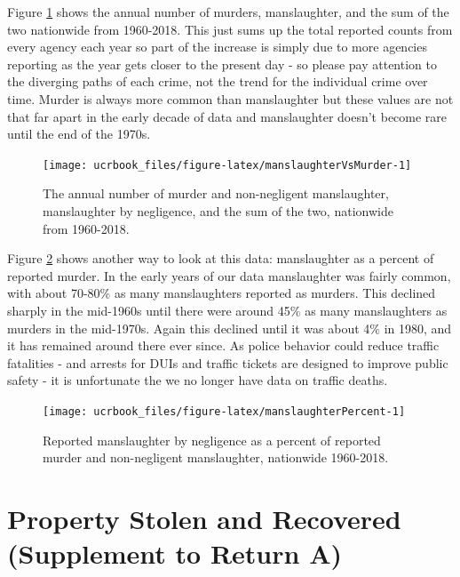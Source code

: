 \documentclass[
  12pt,
  openany]{book}
\begin{document}
Figure \ref{fig:manslaughterVsMurder} shows the annual number of murders, manslaughter, and the sum of the two nationwide from 1960-2018. This just sums up the total reported counts from every agency each year so part of the increase is simply due to more agencies reporting as the year gets closer to the present day - so please pay attention to the diverging paths of each crime, not the trend for the individual crime over time. Murder is always more common than manslaughter but these values are not that far apart in the early decade of data and manslaughter doesn't become rare until the end of the 1970s.

\begin{figure}

{\centering \texttt{[image: ucrbook\_files/figure-latex/manslaughterVsMurder-1]} 

}

\caption{The annual number of murder and non-negligent manslaughter, manslaughter by negligence, and the sum of the two, nationwide from 1960-2018.}\label{fig:manslaughterVsMurder}
\end{figure}

Figure \ref{fig:manslaughterPercent} shows another way to look at this data: manslaughter as a percent of reported murder. In the early years of our data manslaughter was fairly common, with about 70-80\% as many manslaughters reported as murders. This declined sharply in the mid-1960s until there were around 45\% as many manslaughters as murders in the mid-1970s. Again this declined until it was about 4\% in 1980, and it has remained around there ever since. As police behavior could reduce traffic fatalities - and arrests for DUIs and traffic tickets are designed to improve public safety - it is unfortunate the we no longer have data on traffic deaths.

\begin{figure}

{\centering \texttt{[image: ucrbook\_files/figure-latex/manslaughterPercent-1]} 

}

\caption{Reported manslaughter by negligence as a percent of reported murder and non-negligent manslaughter, nationwide 1960-2018.}\label{fig:manslaughterPercent}
\end{figure}

\hypertarget{stolen_property}{%
\chapter{Property Stolen and Recovered (Supplement to Return A)}\label{stolen_property}}
\end{document}
